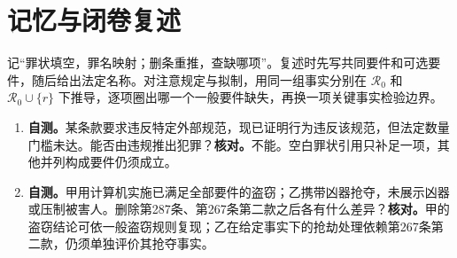 \section*{记忆与闭卷复述}
记“罪状填空，罪名映射；删条重推，查缺哪项”。复述时先写共同要件和可选要件，随后给出法定名称。对注意规定与拟制，用同一组事实分别在 \(\mathcal R_0\) 和 \(\mathcal R_0\cup\{r\}\) 下推导，逐项圈出哪一个一般要件缺失，再换一项关键事实检验边界。
\begin{enumerate}
 \item \textbf{自测。}某条款要求违反特定外部规范，现已证明行为违反该规范，但法定数量门槛未达。能否由违规推出犯罪？\quad\textbf{核对。}不能。空白罪状引用只补足一项，其他并列构成要件仍须成立。
 \item \textbf{自测。}甲用计算机实施已满足全部要件的盗窃；乙携带凶器抢夺，未展示凶器或压制被害人。删除第287条、第267条第二款之后各有什么差异？\quad\textbf{核对。}甲的盗窃结论可依一般盗窃规则复现；乙在给定事实下的抢劫处理依赖第267条第二款，仍须单独评价其抢夺事实。
\end{enumerate}
